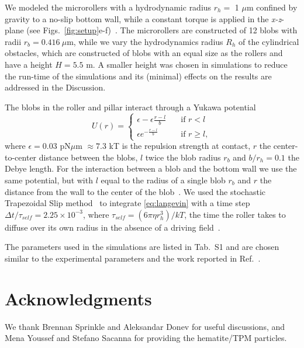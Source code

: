 \documentclass[12pt]{article}
\begin{document}
We modeled the microrollers with a hydrodynamic radius $r_h = $ 1 $\mu$m\cite{geometric} confined by gravity to a no-slip bottom wall, while a constant torque is applied in the \textit{x-z}-plane (see Figs.~\ref{fig:setup}e-f)~\cite{balboa2017hydrodynamics,sprinkle2017large,RigidMultiblobs}. 
The microrollers are constructed of 12 blobs with radii $r_b = 0.416~\mu$m, while we vary the hydrodynamics radius $R_h$ of the cylindrical obstacles, which are constructed of blobs with an equal size as the rollers and have a height $H = 5.5$ \textmu m\cite{OVITOnote}. 
A smaller height was chosen in simulations to reduce the run-time of the simulations and its (minimal) effects on the results are addressed in the Discussion. %

The blobs in the roller and pillar interact through a Yukawa potential
\begin{equation}
U(r) =
  \begin{cases}
    \epsilon - \epsilon \frac{r-l}{b}       & \quad \text{if } r < l \\
    \epsilon  e^{-\frac{r-l}{b}}  & \quad \text{if } r \geq l,
  \end{cases}
  \label{eq:yukawa}
\end{equation}
where $\epsilon=0.03$ pN$\mu$m $\approx 7.3$ kT is the repulsion strength at contact, $r$ the center-to-center distance between the blobs, $l$ twice the blob radius $r_b$ and $b/r_h=0.1$ the Debye length. For the interaction between a blob and the bottom wall we use the same potential, but with $l$ equal to the radius of a single blob $r_b$ and $r$ the distance from the wall to the center of the blob~\cite{balboa2017brownian}.
We used the stochastic Trapezoidal Slip method~\cite{sprinkle2017large} to integrate  \eqref{eq:langevin} with a time step $\Delta t / \tau_{self} = 2.25 \times 10^{-3}$, where $\tau_{self}=(6 \pi \eta r_h^3)/k T$, the time the roller takes to diffuse over its own radius in the absence of a driving field~\cite{goodwin2009colloids}. 

The parameters used in the simulations are listed in Tab.~S1 and are chosen similar to the experimental parameters and the work reported in Ref.~\cite{sprinkle2020active}.


\section*{Acknowledgments}
We thank Brennan Sprinkle and Aleksandar Donev for useful discussions, and Mena Youssef and Stefano Sacanna for providing the hematite/TPM particles.
\end{document}
